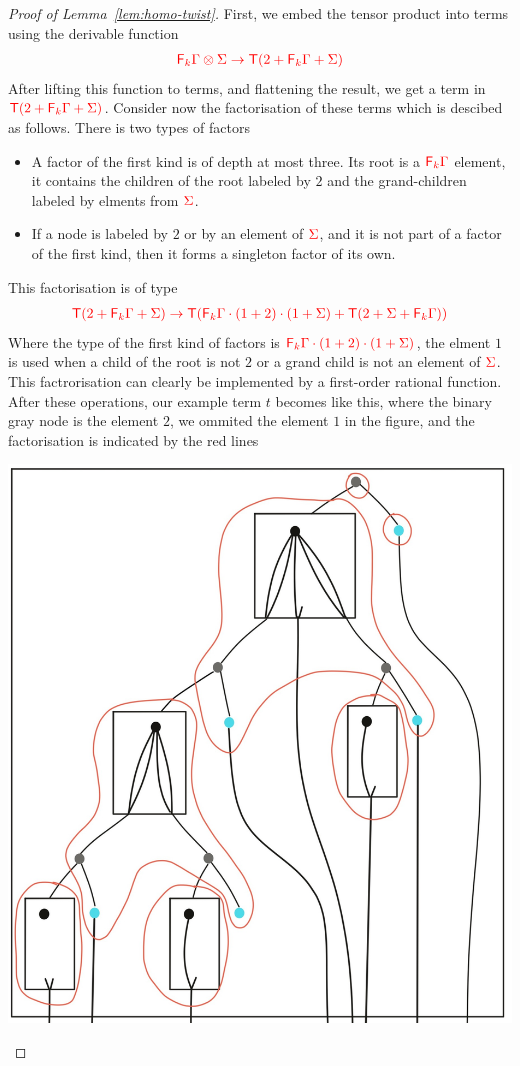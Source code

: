 \begin{proof}[Proof of Lemma~\ref{lem:homo-twist}]
First, we embed the tensor product into terms using the derivable function
\begin{align*}
{\color{red}{{\color{red}{\mathsf F_{k}}}\Gamma \otimes \Sigma \to {\color{red}{\mathsf T}}(2+{\color{red}{\mathsf F_{k}}}\Gamma +\Sigma)}}
\end{align*}
After lifting this function to terms, and flattening the result, we get a term in ${\color{red}{{\color{red}{\mathsf T}}(2+{\color{red}{\mathsf F_{k}}}\Gamma +\Sigma)}}$. 
Consider now the factorisation of these terms
 which is descibed as follows. There is two types of factors
\begin{itemize}
\item  A factor of the first kind is of depth at most three. Its root is a ${\color{red}{\mathsf F_{k}}}{\color{red}{\Gamma}}$ element, it contains the children of the root labeled by $2$ and the grand-children labeled by elments from ${\color{red}{\Sigma}}$.
\item If a node is labeled by $2$ or by an element of ${\color{red}{\Sigma}}$, and it is not part of a factor of the first kind, then it forms a singleton factor of its own.    
\end{itemize}
This factorisation is of type
\begin{align*}
{\color{red}{{\color{red}{\mathsf T}}(2+{\color{red}{\mathsf F_{k}}}\Gamma +\Sigma) \to {\color{red}{\mathsf T}}({\color{red}{\mathsf F_{k}}}\Gamma\cdot(1+2)\cdot(1+\Sigma)+{\color{red}{\mathsf T}}(2+\Sigma+{\color{red}{\mathsf F_{k}}}\Gamma))}}
\end{align*}
Where the type of the first kind of factors is ${\color{red}{{\color{red}{\mathsf F_{k}}}\Gamma\cdot(1+2)\cdot(1+\Sigma)}}$, the elment $1$ is used when a child of the root is not $2$ or a grand child is not an element of ${\color{red}{\Sigma}}$. 
This factrorisation can clearly be implemented by a first-order rational function. After these operations, our example term $t$ becomes like this, where the binary gray node is the element $2$, we ommited the element $1$ in the figure, and the factorisation is indicated by the red lines
\begin{center}
\includegraphics[scale=.1]{MyPic23.jpg}

\end{center}
\end{proof}
